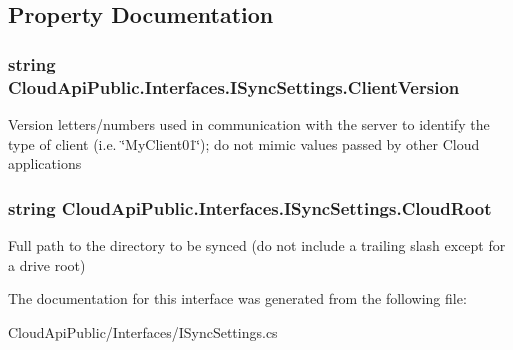 \subsection{Property Documentation}
\hypertarget{interface_cloud_api_public_1_1_interfaces_1_1_i_sync_settings_a10e2af418073326f5ff218b13faee6c6}{
\subsubsection[{Client\-Version}]{\setlength{\rightskip}{0pt plus 5cm}string Cloud\-Api\-Public.\-Interfaces.\-I\-Sync\-Settings.\-Client\-Version\hspace{0.3cm}{\ttfamily [get]}}}\label{interface_cloud_api_public_1_1_interfaces_1_1_i_sync_settings_a10e2af418073326f5ff218b13faee6c6}


Version letters/numbers used in communication with the server to identify the type of client (i.\-e. \char`\"{}\-My\-Client01\char`\"{}); do not mimic values passed by other Cloud applications 

\hypertarget{interface_cloud_api_public_1_1_interfaces_1_1_i_sync_settings_ad67dd7a8c6a5d14d0685532f8344a4ae}{
\subsubsection[{Cloud\-Root}]{\setlength{\rightskip}{0pt plus 5cm}string Cloud\-Api\-Public.\-Interfaces.\-I\-Sync\-Settings.\-Cloud\-Root\hspace{0.3cm}{\ttfamily [get]}}}\label{interface_cloud_api_public_1_1_interfaces_1_1_i_sync_settings_ad67dd7a8c6a5d14d0685532f8344a4ae}


Full path to the directory to be synced (do not include a trailing slash except for a drive root) 



The documentation for this interface was generated from the following file\-:\begin{DoxyCompactItemize}
\item 
Cloud\-Api\-Public/\-Interfaces/I\-Sync\-Settings.\-cs\end{DoxyCompactItemize}
